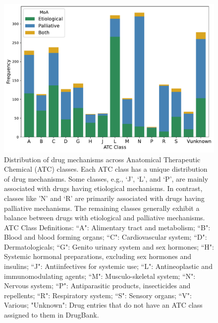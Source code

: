 \documentclass[journal,twoside,web]{ieeecolor}
\begin{document}

\begin{figure}[h!]
    \centering
    \includegraphics[width=\linewidth]{Figures/EPvsATC.pdf}
    \caption{ Distribution of drug mechanisms across Anatomical Therapeutic Chemical (ATC) classes.
    Each ATC class has a unique distribution of drug mechanisms.
    Some classes, e.g., `J', `L', and `P', are mainly associated with drugs having etiological mechanisms.
    In contrast, classes like 'N' and `R' are primarily associated with drugs having palliative mechanisms.
    The remaining classes generally exhibit a balance between drugs with etiological and palliative mechanisms.
    ATC Class Definitions:
   ``A": Alimentary tract and metabolism;
   ``B": Blood and blood forming organs;
   ``C": Cardiovascular system;
   ``D": Dermatologicals;
   ``G": Genito urinary system and sex hormones;
   ``H": Systemic hormonal preparations, excluding sex hormones and insulins;
   ``J": Antiinfectives for systemic use;
   ``L": Antineoplastic and immunomodulating agents;
   ``M": Musculo-skeletal system;
   ``N": Nervous system;
   ``P": Antiparasitic products, insecticides and repellents;
   ``R": Respiratory system;
   ``S": Sensory organs;
   ``V": Various;
   "Unknown": Drug entries that do not have an ATC class assigned to them in DrugBank.
    }
    \label{fig:EPvsATC}
\end{figure}

\end{document}
